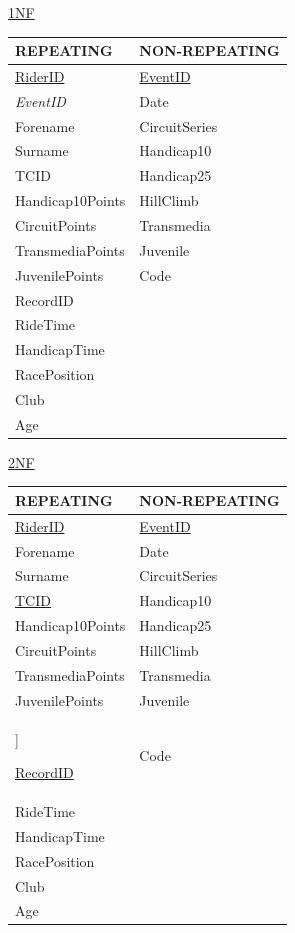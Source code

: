 \underline{1NF}

\begin{tabular}{|l|l|}
\hline
REPEATING           & NON-REPEATING \\ \hline
\underline{RiderID} & \underline{EventID} \\ \hline
\emph{EventID}      & Date \\ \hline
Forename             & CircuitSeries \\ \hline 
Surname             & Handicap10 \\ \hline 
TCID                & Handicap25 \\ \hline
Handicap10Points    & HillClimb \\ \hline 
CircuitPoints       & Transmedia \\ \hline
TransmediaPoints    & Juvenile \\ \hline
JuvenilePoints      & Code \\ \hline
RecordID            & \\ \hline
RideTime            & \\ \hline
HandicapTime        & \\ \hline
RacePosition        & \\ \hline
Club                & \\ \hline
Age                 & \\ \hline

\end{tabular}

\underline{2NF}

\begin{tabular}{|l|l|}
\hline
REPEATING & NON-REPEATING \\ \hline
\underline{RiderID} & \underline{EventID} \\ \hline
Forename & Date \\ \hline
Surname & CircuitSeries \\ \hline 

\underline{TCID} & Handicap10 \\ \hline 
Handicap10Points & Handicap25 \\ \hline
CircuitPoints & HillClimb \\ \hline 
TransmediaPoints & Transmedia \\ \hline
JuvenilePoints & Juvenile \\ \hline]

\underline{RecordID} & Code \\ \hline
RideTime & \\ \hline
HandicapTime & \\ \hline
RacePosition & \\ \hline
Club & \\ \hline
Age & \\ \hline

\end{tabular}

